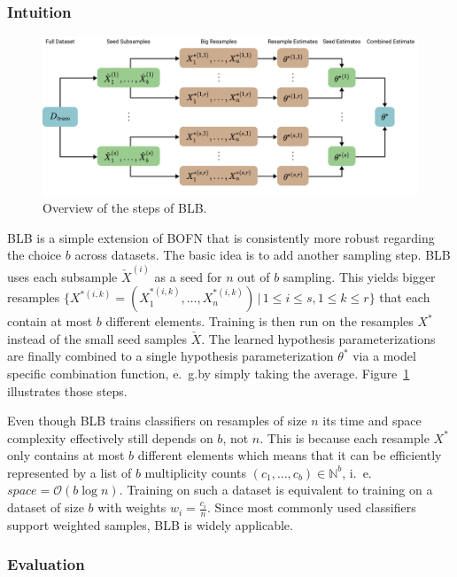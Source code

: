 \subsubsection{Intuition}%
\label{sec:params:blb:intuition}

\begin{figure}
	\centering
	\includegraphics[width=\linewidth]{gfx/blb/overview.pdf}
	\caption{Overview of the steps of BLB.}\label{fig:blb:overview}
\end{figure}
BLB is a simple extension of BOFN that is consistently more robust regarding the choice \(b\) across datasets.
The basic idea is to add another sampling step.
BLB uses each subsample \(\check{X}^{(i)}\) as a seed for \(n\) out of \(b\) sampling.
This yields bigger resamples \(\{X^{*(i, k)} = (X_1^{*(i, k)}, \dots, X_n^{*(i, k)})\, |\, 1 \leq i \leq s, 1 \leq k \leq r\}\) that each contain at most \(b\) different elements.
Training is then run on the resamples \(X^*\) instead of the small seed samples \(\check{X}\).
The learned hypothesis parameterizations are finally combined to a single hypothesis parameterization \(\theta^*\) via a model specific combination function, e.~g.\@ by simply taking the average.
Figure~\ref{fig:blb:overview} illustrates those steps.

Even though BLB trains classifiers on resamples of size \(n\) its time and space complexity effectively still depends on \(b\), not \(n\).
This is because each resample \(X^*\) only contains at most \(b\) different elements which means that it can be efficiently represented by a list of \(b\) multiplicity counts \((c_1, \dots, c_b) \in \mathbb{N}^b\), i.~e.\@ \(\mathit{space} = \mathcal{O}(b \log n)\).
Training on such a dataset is equivalent to training on a dataset of size \(b\) with weights \(w_i = \frac{c_i}{n}\).
Since most commonly used classifiers support weighted samples, BLB is widely applicable.

\subsubsection{Evaluation}%
\label{sec:params:blb:eval}


